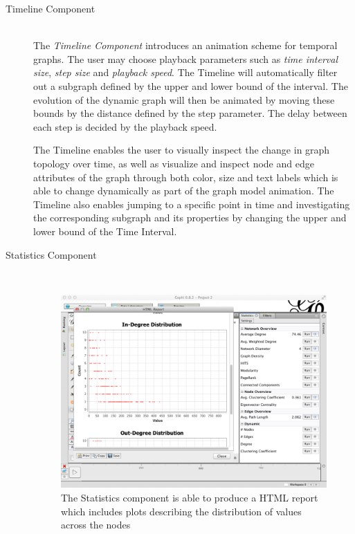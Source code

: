 \begin{description}
\item[Timeline Component] \hfill \\

    The \emph{Timeline Component} introduces an animation scheme for
    temporal graphs. The user may choose playback parameters such as
    \emph{time interval size}, \emph{step size} and \emph{playback
        speed}. The Timeline will automatically filter out a subgraph
    defined by the upper and lower bound of the interval. The evolution
    of the dynamic graph will then be animated by moving these bounds by
    the distance defined by the step parameter. The delay between each
    step is decided by the playback speed.

    The Timeline enables the user to visually inspect the change in
    graph topology over time, as well as visualize and inspect node and
    edge attributes of the graph through both color, size and text
    labels which is able to change dynamically as part of the graph
    model animation. The Timeline also enables jumping to a specific
    point in time and investigating the corresponding subgraph and its
    properties by changing the upper and lower bound of the Time
    Interval.

\item[Statistics Component] \hfill \\

    \begin{figure}[h!]
        \centering
        \includegraphics[width=\linewidth]{figures/gui_statistics}
        \caption{The Statistics component is able to produce a HTML
            report which includes plots describing the distribution of
            values across the nodes}
        \label{fig:gui_statistics}
    \end{figure}


\end{description}

